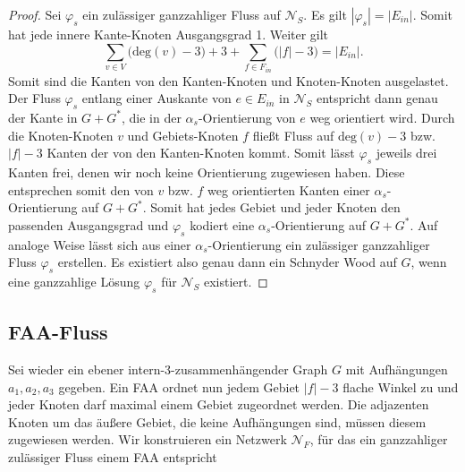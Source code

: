 \begin{proof}
Sei $\varphi_s$ ein zulässiger ganzzahliger Fluss auf $\mathcal{N}_S$. Es gilt $|\varphi_s| = |E_{in}|$. Somit hat jede innere Kante-Knoten Ausgangsgrad 1. Weiter gilt 
$$\sum_{v \in V} \Big(\text{deg}(v)-3\Big) + 3 + \sum_{f \in F_{in}} \Big(|f|-3\Big) = |E_{in}|.$$
Somit sind die Kanten von den Kanten-Knoten und Knoten-Knoten ausgelastet. Der Fluss $\varphi_s$ entlang einer Auskante von $e \in E_{in}$ in $\mathcal{N}_S$ entspricht dann genau der Kante in $G+G^*$, die in der $\alpha_{s}$-Orientierung von $e$ weg orientiert wird. Durch die Knoten-Knoten $v$ und Gebiets-Knoten $f$ fließt Fluss auf $\text{deg}(v)-3$ bzw. $|f|-3$ Kanten der von den Kanten-Knoten kommt. Somit lässt $\varphi_s$ jeweils drei Kanten frei, denen wir noch keine Orientierung zugewiesen haben. Diese entsprechen somit den von $v$ bzw. $f$ weg orientierten Kanten einer $\alpha_{s}$-Orientierung auf $G+G^*$. Somit hat jedes Gebiet und jeder Knoten den passenden Ausgangsgrad und $\varphi_s$ kodiert eine $\alpha_s$-Orientierung auf $G+G^*$. Auf analoge Weise lässt sich aus einer $\alpha_s$-Orientierung ein zulässiger ganzzahliger Fluss $\varphi_s$ erstellen. Es existiert also genau dann ein Schnyder Wood auf $G$, wenn eine ganzzahlige Lösung $\varphi_s$ für $\mathcal{N}_S$ existiert.
\end{proof}

\subsection{FAA-Fluss}\label{faa-flow}

Sei wieder ein ebener intern-3-zusammenhängender Graph $G$ mit Aufhängungen $a_1,a_2,a_3$ gegeben. Ein FAA ordnet nun jedem Gebiet $|f|-3$ flache Winkel zu und jeder Knoten darf maximal einem Gebiet zugeordnet werden. Die adjazenten Knoten um das äußere Gebiet, die keine Aufhängungen sind, müssen diesem zugewiesen werden. Wir konstruieren ein Netzwerk $\mathcal{N}_F$, für das ein ganzzahliger zulässiger Fluss einem FAA entspricht 


